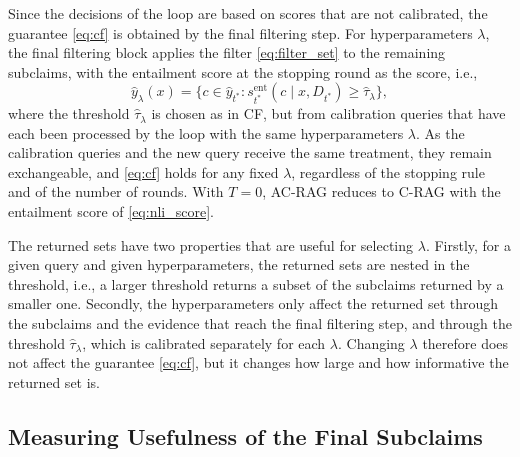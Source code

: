 Since the decisions of the loop are based on scores that are not calibrated, the guarantee \eqref{eq:cf} is obtained by the final filtering step. For hyperparameters $\lambda$, the final filtering block applies the filter \eqref{eq:filter_set} to the remaining subclaims, with the entailment score at the stopping round as the score, i.e.,
\begin{equation}
  \hat{y}_{\lambda}(x) = \bigl\{ c \in \hat{y}_{t^*} : s^{\mathrm{ent}}_{t^*}(c \mid x, D_{t^*}) \geq \hat{\tau}_{\lambda} \bigr\},
  \label{eq:final_cf}
\end{equation}
where the threshold $\hat{\tau}_{\lambda}$ is chosen as in CF, but from calibration queries that have each been processed by the loop with the same hyperparameters $\lambda$. As the calibration queries and the new query receive the same treatment, they remain exchangeable, and \eqref{eq:cf} holds for any fixed $\lambda$, regardless of the stopping rule and of the number of rounds. With $T = 0$, AC-RAG reduces to C-RAG with the entailment score of \eqref{eq:nli_score}.

The returned sets have two properties that are useful for selecting $\lambda$. Firstly, for a given query and given hyperparameters, the returned sets are nested in the threshold, i.e., a larger threshold returns a subset of the subclaims returned by a smaller one. Secondly, the hyperparameters only affect the returned set through the subclaims and the evidence that reach the final filtering step, and through the threshold $\hat{\tau}_{\lambda}$, which is calibrated separately for each $\lambda$. Changing $\lambda$ therefore does not affect the guarantee \eqref{eq:cf}, but it changes how large and how informative the returned set is.


\subsection{Measuring Usefulness of the Final Subclaims}\label{subsec:risks}
 
